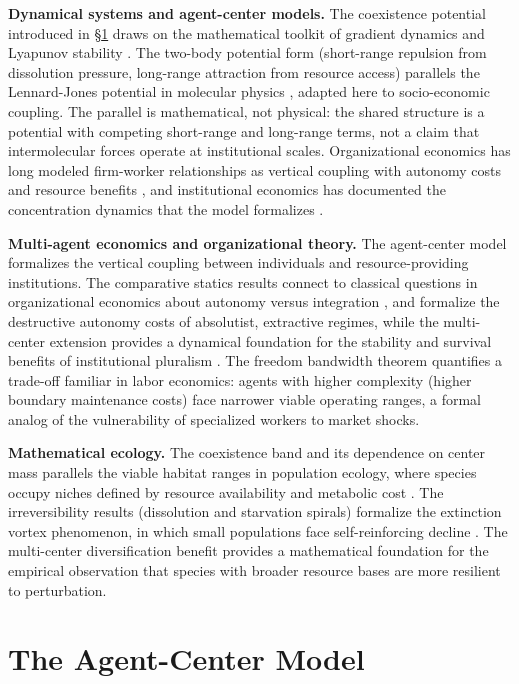\documentclass[11pt]{article}
\theoremstyle{plain}
\theoremstyle{definition}
\theoremstyle{remark}
\let\origsection\section
\renewcommand{\section}{\needspace{12\baselineskip}\origsection}
\begin{document}
\textbf{Dynamical systems and agent-center models.} The coexistence
potential introduced in §\ref{the-agent-center-model} draws on the
mathematical toolkit of gradient dynamics and Lyapunov stability
\citep{Strogatz2015, HirschSmaleDevaney2012}. The two-body potential
form (short-range repulsion from dissolution pressure, long-range
attraction from resource access) parallels the Lennard-Jones potential
in molecular physics \citep{Jones1924}, adapted here to socio-economic
coupling. The parallel is mathematical, not physical: the shared
structure is a potential with competing short-range and long-range
terms, not a claim that intermolecular forces operate at institutional
scales. Organizational economics has long modeled firm-worker
relationships as vertical coupling with autonomy costs and resource
benefits \citep{Tirole1988}, and institutional economics has documented
the concentration dynamics that the model formalizes
\citep{AcemogluRobinson2012}.

\textbf{Multi-agent economics and organizational theory.} The
agent-center model formalizes the vertical coupling between individuals
and resource-providing institutions. The comparative statics results
connect to classical questions in organizational economics about
autonomy versus integration \citep{Tirole1988}, and formalize the
destructive autonomy costs of absolutist, extractive regimes, while the
multi-center extension provides a dynamical foundation for the stability
and survival benefits of institutional pluralism
\citep{AcemogluRobinson2012}. The freedom bandwidth theorem quantifies a
trade-off familiar in labor economics: agents with higher complexity
(higher boundary maintenance costs) face narrower viable operating
ranges, a formal analog of the vulnerability of specialized workers to
market shocks.

\textbf{Mathematical ecology.} The coexistence band and its dependence
on center mass parallels the viable habitat ranges in population
ecology, where species occupy niches defined by resource availability
and metabolic cost \citep{Tilman1982}. The irreversibility results
(dissolution and starvation spirals) formalize the extinction vortex
phenomenon, in which small populations face self-reinforcing decline
\citep{Gilpin1986}. The multi-center diversification benefit provides a
mathematical foundation for the empirical observation that species with
broader resource bases are more resilient to perturbation.

\section{The Agent-Center Model}\label{the-agent-center-model}
\end{document}
